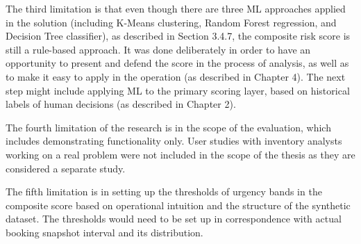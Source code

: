 The third limitation is that even though there are three ML approaches applied in the solution (including K-Means clustering, Random Forest regression, and Decision Tree classifier), as described in Section 3.4.7, the composite risk score is still a rule-based approach. It was done deliberately in order to have an opportunity to present and defend the score in the process of analysis, as well as to make it easy to apply in the operation (as described in Chapter 4). The next step might include applying ML to the primary scoring layer, based on historical labels of human decisions (as described in Chapter 2).

The fourth limitation of the research is in the scope of the evaluation, which includes demonstrating functionality only. User studies with inventory analysts working on a real problem were not included in the scope of the thesis as they are considered a separate study.

The fifth limitation is in setting up the thresholds of urgency bands in the composite score based on operational intuition and the structure of the synthetic dataset. The thresholds would need to be set up in correspondence with actual booking snapshot interval and its distribution.